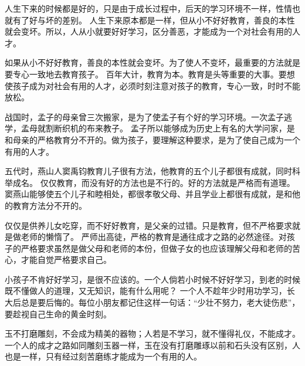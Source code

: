 \documentclass[avery5371,grid]{flashcards}
\newcommand{\doctitle}{新三字經}
\newcommand{\docauthor}{}
\begin{document}
\docshowcopyright
\docshowtitle{\doctitle}{\docauthor}{%
使用双面打印，然后按线剪下。
}




{人生下来的时候都是好的，只是由于成长过程中，后天的学习环境不一样，性情也就有了好与坏的差别。} %
{人生下来原本都是一样，但从小不好好教育，善良的本性就会变坏。所以，人从小就要好好学习，区分善恶，才能成为一个对社会有用的人才。} %

{如果从小不好好教育，善良的本性就会变坏。为了使人不变坏，最重要的方法就是要专心一致地去教育孩子。} %
{百年大计，教育为本。教育是头等重要的大事。要想使孩子成为对社会有用的人才，必须时刻注意对孩子的教育，专心一致，时时不能放松。} %

{战国时，孟子的母亲曾三次搬家，是为了使孟子有个好的学习环境。一次孟子逃学，孟母就割断织机的布来教子。} %
{孟子所以能够成为历史上有名的大学问家，是和母亲的严格教育分不开的。做为孩子，要理解这种要求，是为了使自己成为一个有用的人才。} %

{五代时，燕山人窦禹钧教育儿子很有方法，他教育的五个儿子都很有成就，同时科举成名。} %
{仅仅教育，而没有好的方法也是不行的。好的方法就是严格而有道理。窦燕山能够使五个儿子和睦相处，都很孝敬父母、并且学业上都很有成就，是和他的教育方法分不开的。} %

{仅仅是供养儿女吃穿，而不好好教育，是父亲的过错。只是教育，但不严格要求就是做老师的懒惰了。} %
{严师出高徒，严格的教育是通往成才之路的必然途径。对孩子的严格要求虽然是做父母和老师的本份，但做子女的也应该理解父母和老师的苦心，才能自觉严格要求自己。} %

{小孩子不肯好好学习，是很不应该的。一个人倘若小时候不好好学习，到老的时候既不懂做人的道理，又无知识，能有什么用呢？} %
{一个人不趁年少时用功学习，长大后总是要后悔的。每位小朋友都记住这样一句话：“少壮不努力，老大徒伤悲”，要趁视自己生命的黄金时刻。} %

{玉不打磨雕刻，不会成为精美的器物；人若是不学习，就不懂得礼仪，不能成才。} %
{一个人的成才之路如同雕刻玉器一样，玉在没有打磨雕琢以前和石头没有区别，人也是一样，只有经过刻苦磨练才能成为一个有用的人。} %
\end{document}
